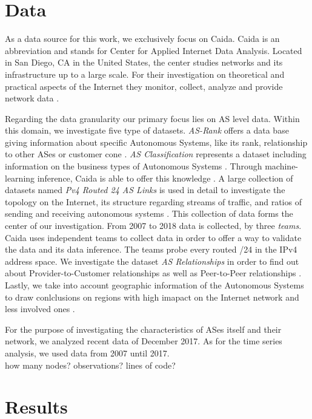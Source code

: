 \documentclass[conference, 11pt]{IEEEtran}
\begin{document}
\section{Data}
As a data source for this work, we exclusively focus on Caida. Caida is an abbreviation and stands for Center for Applied Internet Data Analysis. Located in San Diego, CA in the United States, the center studies networks and its infrastructure up to a large scale. For their investigation on theoretical and practical aspects of the Internet they monitor, collect, analyze and provide network data \cite{Caida}. \\  \linebreak

Regarding the data granularity our primary focus lies on AS level data. Within this domain, we investigate five type of datasets. \textit{AS-Rank} offers a data base giving information about specific Autonomous Systems, like its rank, relationship to other ASes or customer cone  \cite{Rank} . \textit{AS Classification} represents a dataset including information on the business types of Autonomous Systems \cite{Classification}. Through machine-learning inference, Caida is able to offer this knowledge  \cite{Classification}. A large collection of datasets named \textit{Pv4 Routed 24 AS Links} is used in detail to investigate the topology on the Internet, its structure regarding streams of traffic, and ratios of sending and receiving autonomous systems  \cite{IPv4Data}. This collection of data forms the center of our investigation. From 2007 to 2018 data is collected, by three \textit{teams}. Caida uses independent teams to collect data in order to offer a way to validate the data and its data inference. The teams probe every routed /24 in the IPv4 address space.
We investigate the dataset \textit{AS Relationships} in order to find out about Provider-to-Customer relationships as well as Peer-to-Peer relationships \cite{CaidaRelationshipsData}.  Lastly, we take into account geographic information of the Autonomous Systems to draw conlclusions on regions with high imapact on the Internet network and less involved ones  \cite{CaidaGeoData}. 


For the purpose of investigating the characteristics of ASes itself and their network, we analyzed recent data of December 2017.  As for the time series analysis, we used data from 2007 until 2017. \\

how many nodes? observations? lines of code?

\section{Results}
\end{document}
